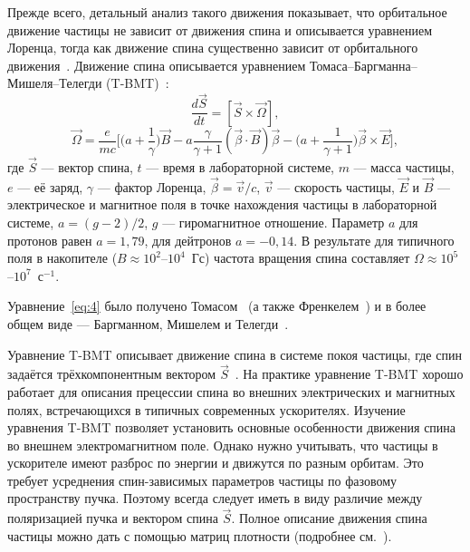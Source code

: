 \documentclass[11pt,a4paper]{article}
\begin{document}
Прежде всего, детальный анализ такого движения показывает, что орбитальное
движение частицы не зависит от движения спина и описывается уравнением
Лоренца, тогда как движение спина существенно зависит от орбитального
движения~\cite{Derbenev73,Hoffstaetter06,Hoffstaetter00,Heinemann01}.
Движение спина описывается уравнением Томаса--Баргманна--Мишеля--Телегди
(T-BMT)~\cite{Jackson76,Mane05}:
\begin{equation}
\frac{d\vec{S}}{dt}=[\vec{S}\times\vec{\Omega}],
\label{eq:3}
\end{equation}
\begin{equation}
\vec{\Omega}=\frac{e}{mc}\Biggl[
\Biggl(a+\frac{1}{\gamma}\Biggr)\vec{B}
-a\frac{\gamma}{\gamma+1}(\vec{\beta}\cdot\vec{B})\vec{\beta}
-\Biggl(a+\frac{1}{\gamma+1}\Biggr)\vec{\beta}\times\vec{E}
\Biggr],
\label{eq:4}
\end{equation}
где $\vec{S}$ --- вектор спина, $t$ --- время в лабораторной системе,
$m$ --- масса частицы, $e$ --- её заряд, $\gamma$ --- фактор Лоренца,
$\vec{\beta}=\vec{v}/c$, $\vec{v}$ --- скорость частицы, $\vec{E}$ и
$\vec{B}$ --- электрическое и магнитное поля в точке нахождения частицы
в лабораторной системе, $a=(g-2)/2$, $g$ --- гиромагнитное отношение.
Параметр $a$ для протонов равен $a=1{,}79$, для дейтронов $a=-0{,}14$.
В результате для типичного поля в накопителе
($B\approx 10^{2}$--$10^{4}$~Гс) частота вращения спина составляет
$\Omega\approx 10^{5}$--$10^{7}$~с$^{-1}$.

Уравнение~\eqref{eq:4} было получено Томасом~\cite{Thomas26}
(а также Френкелем~\cite{Frenkel26}) и в более общем виде ---
Баргманном, Мишелем и Телегди~\cite{BMT59}.

Уравнение T-BMT описывает движение спина в системе покоя частицы,
где спин задаётся трёхкомпонентным вектором $\vec{S}$~\cite{Mane05}.
На практике уравнение T-BMT хорошо работает для описания прецессии спина
во внешних электрических и магнитных полях, встречающихся в типичных
современных ускорителях. Изучение уравнения T-BMT позволяет установить
основные особенности движения спина во внешнем электромагнитном поле.
Однако нужно учитывать, что частицы в ускорителе имеют разброс по энергии
и движутся по разным орбитам. Это требует усреднения спин-зависимых
параметров частицы по фазовому пространству пучка. Поэтому всегда следует
иметь в виду различие между поляризацией пучка и вектором спина $\vec{S}$.
Полное описание движения спина частицы можно дать с помощью матриц
плотности (подробнее см.~\cite{Derbenev73,Hoffstaetter06,Mane05}).
\end{document}
